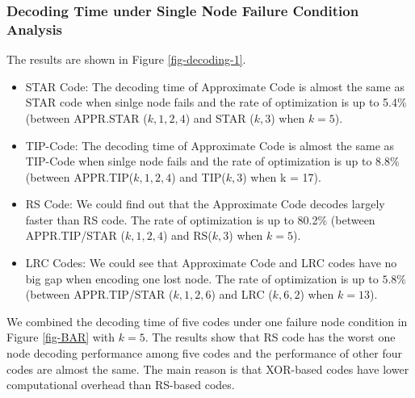 \documentclass[sigconf]{acmart}
\begin{document}
\subsubsection{Decoding Time under Single Node Failure Condition Analysis}
The results are shown in Figure \ref{fig-decoding-1}.
\begin{itemize}
    \item STAR Code: The decoding time of Approximate Code is almost the same as STAR code when sinlge node fails and the rate of optimization is up to 5.4\% (between APPR.STAR ($k,1,2,4$) and STAR ($k,3$) when $k = 5$).
    \item TIP-Code: The decoding time of Approximate Code is almost the same as TIP-Code when sinlge node fails and the rate of optimization is up to 8.8\% (between APPR.TIP($k,1,2,4$) and TIP($k,3$) when k = 17).
    \item RS Code: We could find out that the Approximate Code decodes largely faster than RS code. The rate of optimization is up to 80.2\% (between APPR.TIP/STAR ($k,1,2,4$) and RS($k,3$) when $k = 5$).
    \item LRC Codes: We could see that Approximate Code and LRC codes have no big gap when encoding one lost node. The rate of optimization is up to $5.8\%$ (between APPR.TIP/STAR ($k,1,2,6$) and LRC ($k, 6, 2$) when $k = 13$).
\end{itemize}

We combined the decoding time of five codes under one failure node condition in Figure \ref{fig-BAR} with $k=5$. The results show that RS code has the worst one node decoding performance among five codes and the performance of other four codes are almost the same. The main reason is that XOR-based codes have lower computational overhead than RS-based codes.\par
\end{document}
